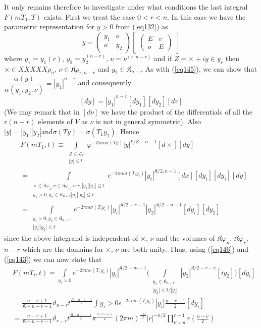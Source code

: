 It only remains therefore to investigate under what conditions the
last integral $F(m T_1, T)$ exists. First we treat the case $0<
r<n$. In this case we have the parametric representation for $y> 0$
from (\ref{eq132}) as 
\begin{equation*}
y=
\begin{pmatrix}
y_1 & o \\
o & y_2
\end{pmatrix}
\begin{bmatrix}
\begin{pmatrix}
E&v\\
o&E
\end{pmatrix}
\end{bmatrix}
\end{equation*}
where $y_1 =y_1{(r)}$, $y_2=y_2^{(n-r)}$, $\nu=\nu^{(r,n-r)}$ and if
$Z=\times + i y \in y_ {r}$ then $\times \in XXXXX \rho_n$, $\nu
\in \mathfrak{K}\rho_{r,n-r}$ and $y_2 \in \mathfrak{K}_{n-r}$ As with
(\ref{eq145}), we can show that  $\dfrac{\alpha(y)}{\alpha(y_1,y_2,
  \nu)}=|y_1|^{n-r}$ and consequently  
$$
[dy]=|y_1|^{n-r}[dy_1][dy_2][dv]
$$
(We may remark that in $[d\nu]$ we have the product of the
differentials of all the $r(n-r)$ elements of $V$ as $\nu$ is not in
general symmetric). 
Also $|y|=|y_1| |y_2| \text{and} \sigma(Ty)= \sigma(T_1y_1)$. Hence  
\begin{align*}
& F(m T_1, t) \equiv \int \limits_{\substack {Z \in \mathcal{L}_{r}
      \\ {|y| \leq t }}} \varphi^{-Z a m \sigma (T
    y)}|y|^{k/Z-n-1}[d \times ][dy] \\ 
& = \int \limits_{\substack {\times \in \mathfrak{K}\varphi_{n}.\nu
      \in\mathfrak{K}\varphi_{n}, n. r, |y_1||y_2| \leq t \\ {y_1>0,
        y_2 \in \mathfrak{K}_{n-r}|y_1||y_2| \leq t }}} e^{-2 \pi m
    \sigma (T_i y_i)} |y_i|^{\mathfrak{K}/2,n-1} [d x][d y_i][d y_i][d
    y]\\ 
& =\int \limits_{\substack {y_i>0, y_2 \in \mathfrak{K}_{n-r} \\ {|y_i|
        |y_2| \leq t }}} e^{-2 \pi m \sigma (T_i y_i)}
  |y_i|^{\mathfrak{K}/2 -r-1} |y_2|^{\mathfrak{K}/2-n-1}[d y_i][d y_2] 
\end{align*} 
since the above integrand is independent of $\times$, $\nu$ and the
volumes of $\mathfrak{K} \varphi_n$, $\mathfrak{K}\varphi_r$, $n-r$ which are
the domains for $\times$, $\nu$ are both unity. Thus, using (\ref{eq146}) and
(\ref{eq143}) we can now state that  
\begin{align*}
& F(m T_i, t) = \int \limits _{y_i>0} e^{-2 \pi m e(T,
    y_i)}|y_i|^{\mathfrak{K}/2-m-1} \bigg(  \int \limits_{\substack
    {y_2 \in \mathfrak{K}_{n-r} \\ {|y_2|  \leq t/|y_i| }}}
  |y_2|^{\mathfrak{K}/2 -r-e}[i y_2]\bigg)[d y_i]\\ 
&= \frac{n-r+1}{\mathfrak{K}-n-r-1} \vartheta_{n-r}
  t^{\frac{\mathfrak{K}-n-r-1}{2}} \int{y_i>0} e^{-2\pi m \sigma (T_i
    y_i)}|y_i| \frac{n-r-1}{2} [d y_i]\\ 
&= \frac{n-r+1}{\mathfrak{K}-n-r-1} \vartheta_{r-r}
  t^{\frac{\mathfrak{K}-n-r-1}{2}}\pi ^{\frac{n(r-1)}{4}}(2\pi
  m)^{\frac{-rt}{2}}|r| ^{-n/2}\prod ^{r-1}_{\nu= a}
  r(\frac{n-\nu}{2}) 
\end{align*}
